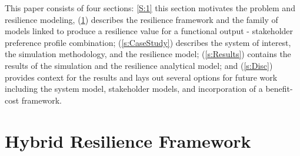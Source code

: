 \documentclass[preprint,12pt]{elsarticle}
\begin{document}

This paper consists of four sections: \ref{S:1} this section motivates
the problem and resilience modeling, 
(\ref{s:HRF}) describes the
resilience framework and the family of models  linked to produce a resilience value for a functional output -
stakeholder preference profile combination; (\ref{s:CaseStudy})
describes the system of interest, the simulation methodology, and the
resilience model; (\ref{s:Results}) contains the results of the 
simulation and the resilience analytical model; and (\ref{s:Disc})
provides context for the results and lays out several options for
future work including the system model, stakeholder
models, and incorporation of a benefit-cost framework. 




\section{Hybrid Resilience Framework}
\label{s:HRF}


\end{document}
